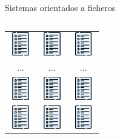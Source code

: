 \begin{frame}{Sistemas orientados a ficheros}
\begin{columns}[T]
\begin{column}{0.30\linewidth}
\begin{block}
\begin{tabular}{c c c}
                    \includegraphics[width=1cm]{img/list.png}
                    & \includegraphics[width=1cm]{img/list.png}
                    & \includegraphics[width=1cm]{img/list.png}\\
    
    
                    ... & ... & ...\\
    
                    \includegraphics[width=1cm]{img/list.png}
                    & \includegraphics[width=1cm]{img/list.png}
                    & \includegraphics[width=1cm]{img/list.png}\\
    
                    \includegraphics[width=1cm]{img/list.png}
                    & \includegraphics[width=1cm]{img/list.png}
                    & \includegraphics[width=1cm]{img/list.png}\\
    
                \end{tabular}
            \end{block}
            

\end{column}
\end{columns}
\end{frame}
